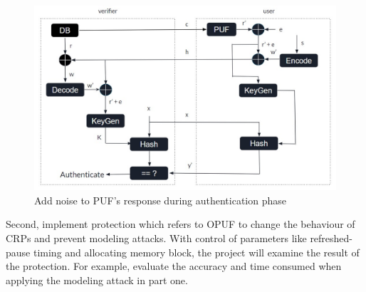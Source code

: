 \begin{figure}[htp]
    \centering
    \includegraphics[width=18cm]{figures/figure10.jpg}
    \caption{Add noise to PUF's response during authentication phase \cite{Reference8}}
    \label{fig:figure10}
    \end{figure}

Second, implement protection which refers to OPUF to change the behaviour of CRPs and prevent modeling attacks. With control of parameters like refreshed-pause timing and allocating memory block, 
the project will examine the result of the protection. For example, evaluate the accuracy and time consumed when applying the modeling attack in part one.






